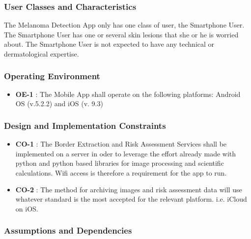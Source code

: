         \subsubsection{User Classes and Characteristics}

            The Melanoma Detection App only has one class of user, the Smartphone User. The Smartphone User has one or several skin lesions that she or he is worried about.
The Smartphone User is not expected to have any technical or dermatological expertise.

        \subsubsection{Operating Environment}

                    \noindent
                    \begin{itemize}[leftmargin=*]
                        \item[]  \textbf{OE-1} : The Mobile App shall operate on the following platforms: Android OS (v.5.2.2) and iOS (v. 9.3)

                    \end{itemize}


        \subsubsection{Design and Implementation Constraints}

                    \noindent
                    \begin{itemize}[leftmargin=*]
                        \item[]  \textbf{CO-1} : The Border Extraction and Risk Assessment Services shall be implemented on a server in oder to leverage the effort already made with python and python based libraries for image processing and scientific calculations. Wifi access is therefore a requirement for the app to run.
                        \item[]  \textbf{CO-2} : The method for archiving images and risk assessment data will use whatever standard is the most accepted for the relevant platform. i.e. iCloud on iOS.


                    \end{itemize}


        \subsubsection{Assumptions and Dependencies}


